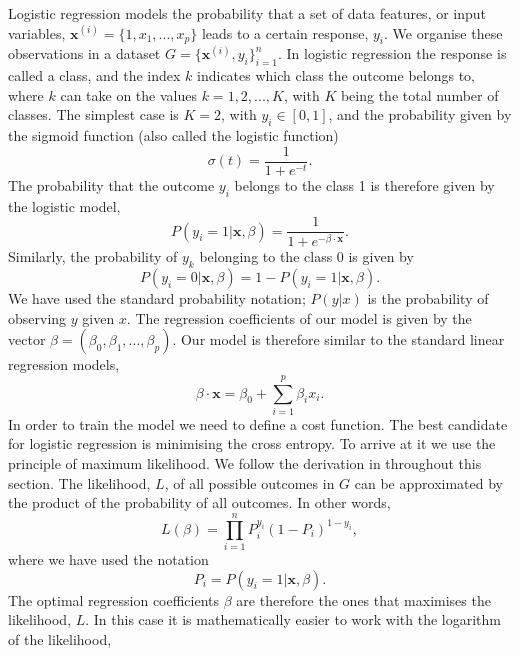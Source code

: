 \documentclass[a4paper, 
amsfonts, 
amssymb, 
amsmath, 
reprint, 
showkeys, 
nofootinbib, 
twoside]{revtex4-2}
\begin{document}
Logistic regression models the probability that a set of data features, or input variables, $\bm{x}^{(i)} = \{1, x_1, ... ,x_p\}$ leads to a certain response, $y_i$. We organise these observations in a  dataset $G = \{\mathbf{x}^{(i)}, y_i\}_{i = 1}^n$. In logistic regression the response is called a class, and the index $k$ indicates which class the outcome belongs to, where $k$ can take on the values $k = 1, 2, ... , K$, with $K$ being the total number of classes. The simplest case is $K = 2$, with $y_i \in [0, 1]$, and the probability given by the sigmoid function (also called the logistic function)
\begin{equation}
    \sigma(t) = \frac{1}{1 + e^{-t}}.
    \label{eq:sigmoid}
\end{equation}
The probability that the outcome $y_i$ belongs to the class 1 is therefore given by the logistic model,
\begin{equation}
    P(y_i = 1 \vert \bm{x}, \beta) = \frac{1}{1 + e^{-\beta \cdot \bm{x}}}.
\end{equation}
Similarly, the probability of $y_k$ belonging to the class 0 is given by
\begin{equation}
     P(y_i = 0 \vert \bm{x}, \beta) = 1 - P(y_i = 1 \vert \bm{x}, \beta).
\end{equation}
We have used the standard probability notation; $P(y\vert x)$ is the probability of observing $y$ given $x$. 
The regression coefficients of our model is given by the vector $\beta = (\beta_0, \beta_1, ..., \beta_p)$. Our model is therefore similar to the standard linear regression models,
\begin{equation}
    \beta \cdot \bm{x} = \beta_0 + \sum_{i = 1}^p \beta_i x_i. 
\end{equation}
In order to train the model we need to define a cost function. The best candidate for logistic regression is minimising the cross entropy. To arrive at it we use the principle of maximum likelihood. We follow the derivation in \cite[page 120]{Hastie} throughout this section. The likelihood, $L$, of all possible outcomes in $G$ can be approximated by the product of the probability of all outcomes. In other words, 
\begin{equation}
    L(\beta) = \prod_{i = 1}^n P_i^{y_i}(1 - P_i)^{1 - y_i},
\end{equation}
where we have used the notation
\begin{equation}
    P_i = P(y_i = 1 \vert \bm{x}, \beta).
\end{equation}
The optimal regression coefficients $\beta$ are therefore the ones that maximises the likelihood, $L$. In this case it is mathematically easier to work with the logarithm of the likelihood, 
\end{document}
